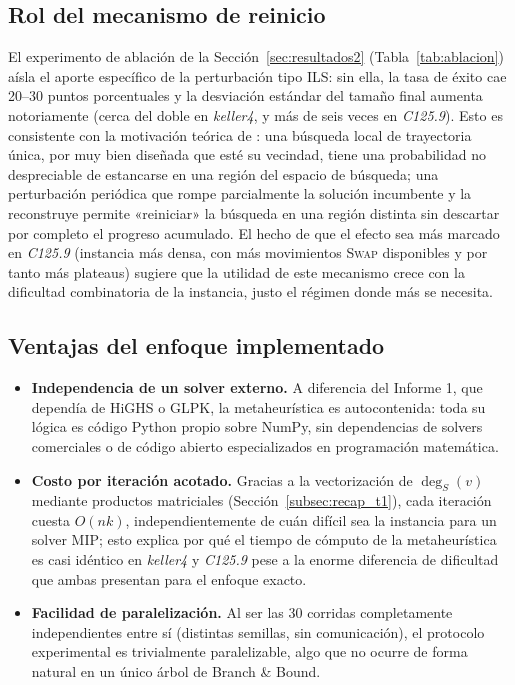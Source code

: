 \subsection{Rol del mecanismo de reinicio}

El experimento de ablación de la Sección~\ref{sec:resultados2} (Tabla~\ref{tab:ablacion}) aísla el aporte específico de la perturbación tipo ILS: sin ella, la tasa de éxito cae 20--30 puntos porcentuales y la desviación estándar del tamaño final aumenta notoriamente (cerca del doble en \textit{keller4}, y más de seis veces en \textit{C125.9}). Esto es consistente con la motivación teórica de \textcite{lourenco2003ils}: una búsqueda local de trayectoria única, por muy bien diseñada que esté su vecindad, tiene una probabilidad no despreciable de estancarse en una región del espacio de búsqueda; una perturbación periódica que rompe parcialmente la solución incumbente y la reconstruye permite «reiniciar» la búsqueda en una región distinta sin descartar por completo el progreso acumulado. El hecho de que el efecto sea más marcado en \textit{C125.9} (instancia más densa, con más movimientos \textsc{Swap} disponibles y por tanto más plateaus) sugiere que la utilidad de este mecanismo crece con la dificultad combinatoria de la instancia, justo el régimen donde más se necesita.

\subsection{Ventajas del enfoque implementado}

\begin{itemize}
    \item \textbf{Independencia de un solver externo.} A diferencia del Informe 1, que dependía de HiGHS o GLPK, la metaheurística es autocontenida: toda su lógica es código Python propio sobre NumPy, sin dependencias de solvers comerciales o de código abierto especializados en programación matemática.
    \item \textbf{Costo por iteración acotado.} Gracias a la vectorización de $\deg_S(v)$ mediante productos matriciales (Sección~\ref{subsec:recap_t1}), cada iteración cuesta $O(nk)$, independientemente de cuán difícil sea la instancia para un solver MIP; esto explica por qué el tiempo de cómputo de la metaheurística es casi idéntico en \textit{keller4} y \textit{C125.9} pese a la enorme diferencia de dificultad que ambas presentan para el enfoque exacto.
    \item \textbf{Facilidad de paralelización.} Al ser las 30 corridas completamente independientes entre sí (distintas semillas, sin comunicación), el protocolo experimental es trivialmente paralelizable, algo que no ocurre de forma natural en un único árbol de Branch \& Bound.
\end{itemize}

